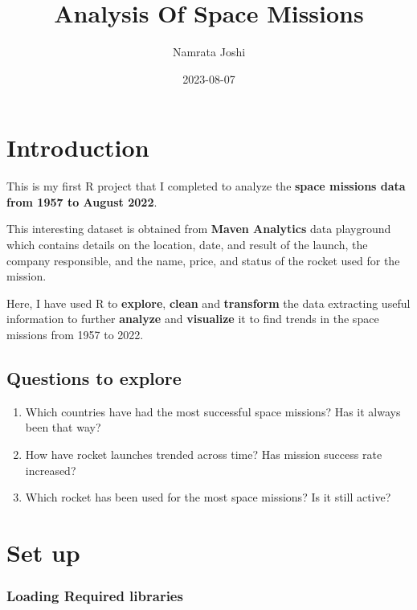 \documentclass[
]{article}
\title{Analysis Of Space Missions}
\author{Namrata Joshi}
\date{2023-08-07}
\begin{document}
\maketitle

\hypertarget{introduction}{%
\section{Introduction}\label{introduction}}

This is my first R project that I completed to analyze the \textbf{space
missions data from 1957 to August 2022}.

This interesting dataset is obtained from \textbf{Maven Analytics} data
playground which contains details on the location, date, and result of
the launch, the company responsible, and the name, price, and status of
the rocket used for the mission.

Here, I have used R to \textbf{explore}, \textbf{clean} and
\textbf{transform} the data extracting useful information to further
\textbf{analyze} and \textbf{visualize} it to find trends in the space
missions from 1957 to 2022.

\hypertarget{questions-to-explore}{%
\subsection{Questions to explore}\label{questions-to-explore}}

\begin{enumerate}
\def\labelenumi{\arabic{enumi}.}
\item
  Which countries have had the most successful space missions? Has it
  always been that way?
\item
  How have rocket launches trended across time? Has mission success rate
  increased?
\item
  Which rocket has been used for the most space missions? Is it still
  active?
\end{enumerate}

\hypertarget{set-up}{%
\section{Set up}\label{set-up}}

\hypertarget{loading-required-libraries}{%
\subsubsection{Loading Required
libraries}\label{loading-required-libraries}}
\end{document}
